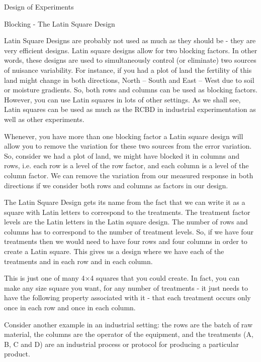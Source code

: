 Design of Experiments

Blocking - The Latin Square Design


Latin Square Designs are probably not used as much as they should be - they are very efficient designs. Latin square designs allow for two blocking factors. In other words, these designs are used to simultaneously control (or eliminate) two sources of nuisance variability. For instance, if you had a plot of land the fertility of this land might change in both directions, North -- South and East -- West due to soil or moisture gradients. So, both rows and columns can be used as blocking factors. However, you can use Latin squares in lots of other settings. As we shall see, Latin squares can be used as much as the RCBD in industrial experimentation as well as other experiments.

Whenever, you have more than one blocking factor a Latin square design will allow you to remove the variation for these two sources from the error variation. So, consider we had a plot of land, we might have blocked it in columns and rows, i.e. each row is a level of the row factor, and each column is a level of the column factor. We can remove the variation from our measured response in both directions if we consider both rows and columns as factors in our design.

The Latin Square Design gets its name from the fact that we can write it as a square with Latin letters to correspond to the treatments. The treatment factor levels are the Latin letters in the Latin square design. The number of rows and columns has to correspond to the number of treatment levels. So, if we have four treatments then we would need to have four rows and four columns in order to create a Latin square. This gives us a design where we have each of the treatments and in each row and in each column.



This is just one of many 4×4 squares that you could create. In fact, you can make any size square you want, for any number of treatments - it just needs to have the following property associated with it - that each treatment occurs only once in each row and once in each column.

Consider another example in an industrial setting: the rows are the batch of raw material, the columns are the operator of the equipment, and the treatments (A, B, C and D) are an industrial process or protocol for producing a particular product.

